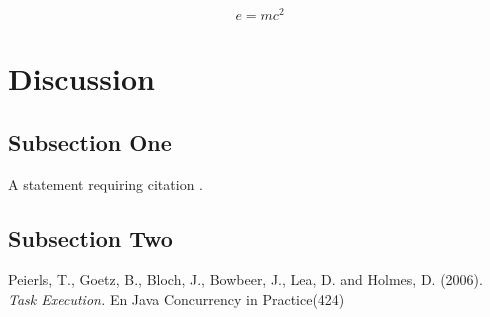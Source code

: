 \documentclass[twoside,twocolumn]{article}
\begin{document}
\blindtext %

\begin{equation}
\label{eq:emc}
e = mc^2
\end{equation}

\blindtext %


\section{Discussion}

\subsection{Subsection One}

A statement requiring citation \cite{Figueredo:2009dg}.
\blindtext %

\subsection{Subsection Two}

\blindtext %



\begin{thebibliography}{99} %

Peierls, T., Goetz, B., Bloch, J., Bowbeer, J., Lea, D. and Holmes, D. (2006).
\newblock \textit{Task Execution.} 
En Java Concurrency in Practice(424)
 
\end{thebibliography}

\end{document}
